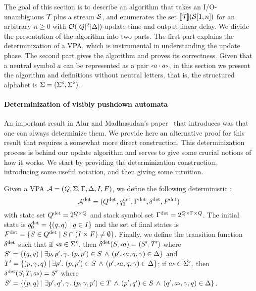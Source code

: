 

The goal of this section is to describe an algorithm that takes an I/O-unambiguous \vpann $\mathcal{T}\!$ plus a stream $\mathcal{S}$, and enumerates the set $\llbracket \mathcal{T}\! \rrbracket(\mathcal{S}[1,n])$ for an arbitrary $n\geq 0$ with $\mathcal{O}(|Q|^2 |\Delta|)$-update-time and output-linear delay.
We divide the presentation of the algorithm into two parts. The first part explains the determinization of a VPA, which is instrumental in understanding the update phase. The second part gives the algorithm and proves its correctness. 
Given that a neutral symbol $a$ can be represented as a pair ${\scriptsize\texttt{<}} a \cdot a{\scriptsize\texttt{>}}$, in this section we present the algorithm and definitions without neutral letters, that is, the structured alphabet is $\Sigma = (\Sigma^{\texttt{<}}, \Sigma^{\texttt{>}})$. 

\paragraph{Determinization of visibly pushdown automata} 
An important result in Alur and Madhusudan's paper~\cite{AlurM04} that introduces \vpa was that one can always determinize them. We provide here an alternative proof for this result that requires a somewhat more direct construction. This determinization process is behind our update algorithm and serves to give some crucial notions of how it works. We start by providing the determinization construction, introducing some useful notation, and then giving some intuition.

Given a VPA $\mathcal{A} = (Q, \Sigma, \Gamma, \Delta, I, F)$, we define the following deterministic \vpa: 
\[
\mathcal{A}^{\operatorname{det}} = (Q^{\operatorname{det}}, q_0^{\operatorname{det}}, \Gamma^{\operatorname{det}}, \delta^{\operatorname{det}}, F^{\operatorname{det}})
\] 
with state set $Q^{\operatorname{det}} = 2^{Q\times Q}$ and stack symbol set $\Gamma^{\operatorname{det}} = 2^{Q\times \Gamma \times Q}$. The initial state is $q_0^{\operatorname{det}} = \{(q,q)\mid q\in I\}$ and the set of final states is $F^{\operatorname{det}} = \{S \in Q^{\operatorname{det}} \mid S \cap (I\times F) \neq \emptyset\}$. 
Finally, we define the transition function $\delta^{\operatorname{det}}$ such that if ${\scriptsize\texttt{<}} a\in\Sigma^{\texttt{<}}$, then $\delta^{\operatorname{det}}(S,{\scriptsize\texttt{<}} a) = (S',T')$ where
$S' =  \{(q,q) \mid \exists p, p', \gamma. \ (p,p')\in S \, \wedge \,  (p',{\scriptsize\texttt{<}} a,q,\gamma)\in\Delta\}$ and $\aT' = \{ (p,\gamma, q) \mid \exists p'. \ (p,p')\in \aS  \, \wedge \,  (p',\op{a},q,\gamma)\in\Delta\}$; if $a{\scriptsize\texttt{>}}\in\Sigma^{\texttt{>}}$, then $\delta^{\operatorname{det}}(S,T,a{\scriptsize\texttt{>}}) = S'$ where
$\aS' = \{ (p,q) \mid \exists p',q', \gamma. \ (p,\gamma,p')\in \aT \, \wedge \, (p',q')\in \aS \text \, \wedge \, (q',\cl{a},\gamma, q)\in\Delta \}$.


